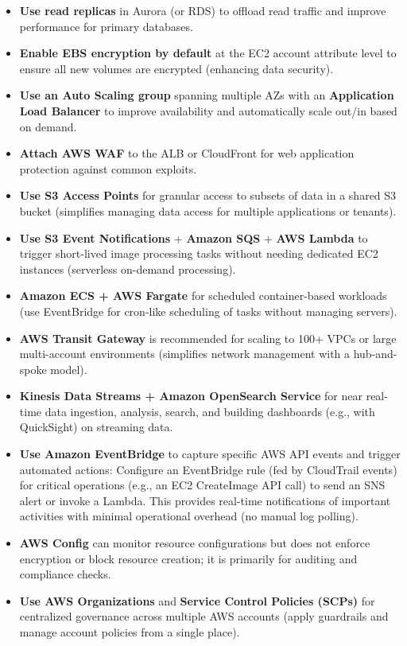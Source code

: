 \documentclass[11pt,a4paper]{report}
\begin{document}
\begin{itemize}
  \item \textbf{Use read replicas} in Aurora (or RDS) to offload read traffic and improve performance for primary databases.
  \item \textbf{Enable EBS encryption by default} at the EC2 account attribute level to ensure all new volumes are encrypted (enhancing data security).
  \item \textbf{Use an Auto Scaling group} spanning multiple AZs with an \textbf{Application Load Balancer} to improve availability and automatically scale out/in based on demand.
  \item \textbf{Attach AWS WAF} to the ALB or CloudFront for web application protection against common exploits.
  \item \textbf{Use S3 Access Points} for granular access to subsets of data in a shared S3 bucket (simplifies managing data access for multiple applications or tenants).
  \item \textbf{Use S3 Event Notifications} + \textbf{Amazon SQS} + \textbf{AWS Lambda} to trigger short-lived image processing tasks without needing dedicated EC2 instances (serverless on-demand processing).
  \item \textbf{Amazon ECS + AWS Fargate} for scheduled container-based workloads (use EventBridge for cron-like scheduling of tasks without managing servers).
  \item \textbf{AWS Transit Gateway} is recommended for scaling to 100+ VPCs or large multi-account environments (simplifies network management with a hub-and-spoke model).
  \item \textbf{Kinesis Data Streams + Amazon OpenSearch Service} for near real-time data ingestion, analysis, search, and building dashboards (e.g., with QuickSight) on streaming data.
  \item \textbf{Use Amazon EventBridge} to capture specific AWS API events and trigger automated actions: Configure an EventBridge rule (fed by CloudTrail events) for critical operations (e.g., an EC2 CreateImage API call) to send an SNS alert or invoke a Lambda. This provides real-time notifications of important activities with minimal operational overhead (no manual log polling).
  \item \textbf{AWS Config} can monitor resource configurations but does not enforce encryption or block resource creation; it is primarily for auditing and compliance checks.
  \item \textbf{Use AWS Organizations} and \textbf{Service Control Policies (SCPs)} for centralized governance across multiple AWS accounts (apply guardrails and manage account policies from a single place).

\end{itemize}
\end{document}
